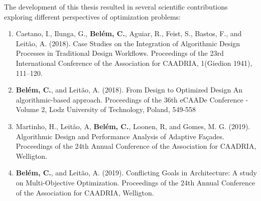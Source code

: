 The development of this thesis resulted in several scientific contributions exploring different perspectives of optimization problems:

\begin{enumerate}
\item Caetano, I., Ilunga, G., \textbf{Belém, C.}, Aguiar, R., Feist, S., Bastos, F., and Leitão, A. (2018). Case Studies on the Integration of Algorithmic Design Processes in Traditional Design Workflows. Proceedings of the 23rd International Conference of the Association for CAADRIA, 1(Giedion 1941), 111–120.

\item \textbf{Belém, C.}, and Leitão, A. (2018). From Design to Optimized Design An algorithmic-based approach. Proceedings of the 36th eCAADe Conference - Volume 2, Lodz University of Technology, Poland, 549-558

\item Martinho, H., Leitão, A, \textbf{Belém, C.}, Loonen, R, and Gomes, M. G. (2019). Algorithmic Design and Performance Analysis of Adaptive Façades. Proceedings of the 24th Annual Conference of the Association for CAADRIA, Welligton.

\item \textbf{Belém, C.}, and Leitão, A. (2019). Conflicting Goals in Architecture: A study on Multi-Objective Optimization. Proceedings of the 24th Annual Conference of the Association for CAADRIA, Welligton.
\end{enumerate}



